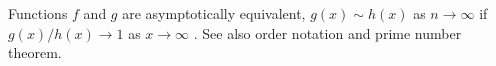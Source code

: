 Functions  $ f $  and  $ g $  are asymptotically equivalent,  $ g(x) \sim h(x) $ 
as  $ n \to \infty  $  if  $ g(x)/h(x) \to 1 $  as  $ x \to  \infty  $ . See also
order notation and prime number theorem.